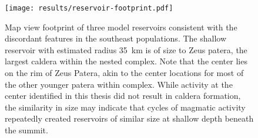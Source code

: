 \begin{figure}
    \texttt{[image: results/reservoir-footprint.pdf]}
    \caption[Model reservoir footprints]{Map view footprint of three model reservoirs consistent with the discordant features in the southeast populations. The shallow reservoir with estimated radius \qty{35}{km} is of size to Zeus patera, the largest caldera within the nested complex. Note that the center lies on the rim of Zeus Patera, akin to the center locations for most of the other younger patera within complex. While activity at the center identified in this thesis did not result in caldera formation, the similarity in size may indicate that cycles of magmatic activity repeatedly created reservoirs of similar size at shallow depth beneath the summit.}
    \label{fig:reservoir-footprint}
\end{figure}